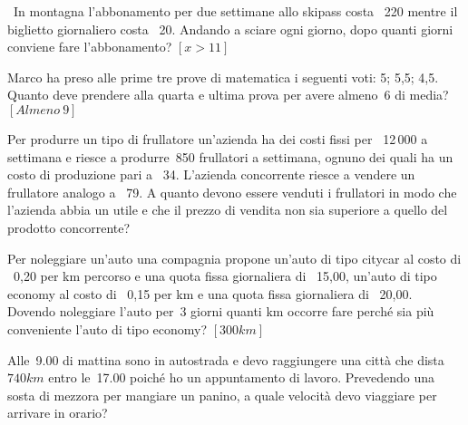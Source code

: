 \begin{multicols}{2}
 \begin{esercizio}[\Ast]
 \label{ese:21.23}
 \ In montagna l'abbonamento per due settimane allo
skipass costa \officialeuro\ 220 mentre il biglietto giornaliero costa
\officialeuro\ 20. Andando a sciare ogni giorno, dopo quanti giorni
conviene fare l'abbonamento? \hfill \(\left[x>11\right]\)
 \end{esercizio}

 \begin{esercizio}[\Ast]
 \label{ese:21.24}
 Marco ha preso alle prime tre prove di matematica i seguenti voti: 5;
5,5; 4,5. Quanto deve prendere alla quarta e ultima prova per avere almeno~6
di media? \hfill \(\left[Almeno~9\right]\)
 \end{esercizio}

 \begin{esercizio}
 \label{ese:21.25}
 Per produrre un tipo di frullatore un'azienda ha dei
costi fissi per \officialeuro\ 12\,000 a settimana e riesce a produrre~850
frullatori a settimana, ognuno dei quali ha un costo di produzione pari
a \officialeuro\ 34. L'azienda concorrente riesce a
vendere un frullatore analogo a \officialeuro\ 79. A quanto devono essere
venduti i frullatori in modo che l'azienda abbia un
utile e che il prezzo di vendita non sia superiore a quello del
prodotto concorrente?
 \end{esercizio}

 \begin{esercizio}[\Ast]
 \label{ese:21.26}
 Per noleggiare un'auto una compagnia propone
un'auto di tipo citycar al costo di \officialeuro\ 0,20 per km percorso e una 
quota fissa giornaliera
di \officialeuro\ 15,00,
un'auto di tipo economy al costo di \officialeuro\ 0,15
per km e una quota fissa giornaliera di \officialeuro\ 20,00. Dovendo
noleggiare l'auto per~3 giorni quanti km occorre fare
perché sia più conveniente l'auto di tipo economy?
 \hfill \(\left[300\unit{km}\right]\)
 \end{esercizio}

 \begin{esercizio}
 \label{ese:21.27}
 Alle~9.00 di mattina sono in autostrada e devo raggiungere una città
che dista~\(740\unit{km}\) entro le~17.00 poiché ho un appuntamento di lavoro.
Prevedendo una sosta di mezzora per mangiare un panino, a quale
velocità devo viaggiare per arrivare in orario?
 \end{esercizio}



\end{multicols}
